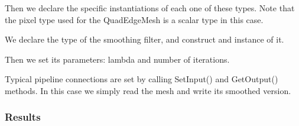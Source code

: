 \documentclass{InsightArticle}
\begin{document}
Then we declare the specific instantiations of each one of these types. Note that the
pixel type used for the QuadEdgeMesh is a scalar type in this case.

\begin{center}

\end{center}

We declare the type of the smoothing filter, and construct and instance of it. 

\begin{center}

\end{center}

Then we set its parameters: lambda and number of iterations.

\begin{center}

\end{center}

Typical pipeline connections are set by calling SetInput() and GetOutput() methods.
In this case we simply read the mesh and write its smoothed version.

\begin{center}

\end{center}



\subsubsection{Results}



%
%



\end{document}

